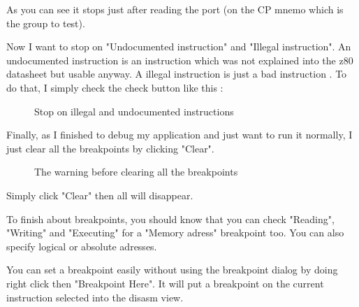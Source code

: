 \documentclass[10pt]{report}
\begin{document}
As you can see it stops just after reading the port (on the CP mnemo which is the group to test).\newline

Now I want to stop on "Undocumented instruction" and "Illegal instruction".\newline
An undocumented instruction is an instruction which was not explained into the z80 datasheet but usable anyway.\newline
A illegal instruction is just a bad instruction .\newline
To do that, I simply check the check button like this :\newline
\begin{figure}[H]
\centering
{}
\caption{Stop on illegal and undocumented instructions}
\end{figure}

Finally, as I finished to debug my application and just want to run it normally, I just clear all the breakpoints by clicking "Clear".\newline
\begin{figure}[H]
\centering
{}
\caption{The warning before clearing all the breakpoints}
\end{figure}
Simply click "Clear" then all will disappear.\newline\newline

To finish about breakpoints, you should know that you can check "Reading", "Writing" and "Executing" for a "Memory adress" breakpoint too.\newline
You can also specify logical or absolute adresses.\newline\newline

You can set a breakpoint easily without using the breakpoint dialog by doing right click then "Breakpoint Here".\newline
It will put a breakpoint on the current instruction selected into the disasm view.\newline
\end{document}
